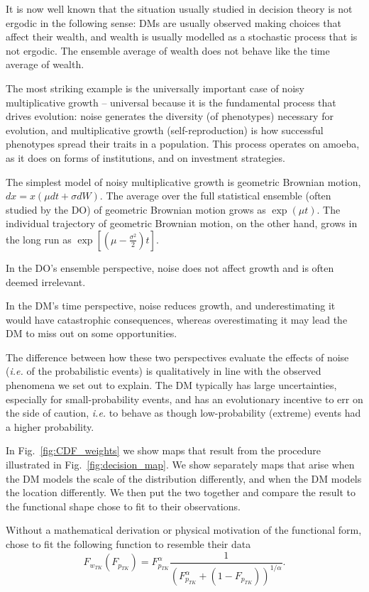 \documentclass[11pt]{article}
\newcommand{\elabel}[1]{\label{eq:#1}}
\newcommand{\ie}{{\it i.e.}\xspace}
\newcommand{\fref}[1]{Fig.~\ref{fig:#1}}
\newcommand{\be}{\begin{equation}}
\newcommand{\ee}{\end{equation}}
\numberwithin{equation}{section}
\begin{document}
It is now well known that the situation usually studied in decision theory is not ergodic in the following sense: DMs are usually observed making choices that affect their wealth, and wealth is usually modelled as a stochastic process that is not ergodic. The ensemble average of wealth does not behave like the time average of wealth.

The most striking example is the universally important case of noisy multiplicative growth -- universal because it is the fundamental process that drives evolution: noise generates the diversity (of phenotypes) necessary for evolution, and multiplicative growth (self-reproduction) is how successful phenotypes spread their traits in a population. This process operates on amoeba, as it does on forms of institutions, and on investment strategies. 

The simplest model of noisy multiplicative growth is geometric Brownian motion, $dx=x(\mu dt+\sigma dW)$. The average over the full statistical ensemble (often studied by the DO) of geometric Brownian motion grows as $\exp(\mu t)$. The individual trajectory of geometric Brownian motion, on the other hand, grows in the long run as $\exp[(\mu-\frac{\sigma^2}{2})t]$.

In the DO's ensemble perspective, noise does not affect growth and is often deemed irrelevant.

In the DM's time perspective, noise reduces growth, and  underestimating it would have catastrophic consequences, whereas overestimating it may lead the DM to miss out on some opportunities.

The difference between how these two perspectives evaluate the effects of noise (\ie of the probabilistic events) is qualitatively in line with the observed phenomena we set out to explain. The DM typically has large uncertainties, especially for small-probability events, and has an evolutionary incentive to err on the side of caution, \ie to behave as though low-probability (extreme) events had a higher probability.


In \fref{CDF_weights} we show maps that result from the procedure illustrated in \fref{decision_map}. We show separately maps that arise when the DM models the scale of the distribution differently, and when the DM models the location differently. We then put the two together and compare the result to the functional shape \citet{TverskyKahneman1992} chose to fit to their observations.

Without a mathematical derivation or physical motivation of the functional form,  \citet{TverskyKahneman1992} chose to fit the following function to resemble their data
\be
F_{w_{TK}}(F_{p_{TK}})=F_{p_{TK}}^\alpha \frac{1}{(F_{p_{TK}}^\alpha+(1-F_{p_{TK}}))^{1/\alpha}}.
\elabel{correspondence}
\ee
\end{document}
